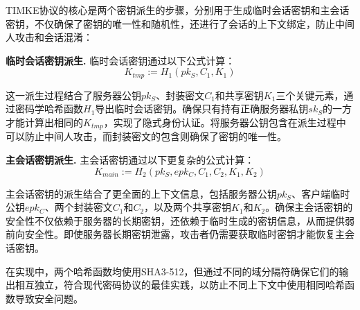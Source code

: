TIMKE协议的核心是两个密钥派生的步骤，分别用于生成临时会话密钥和主会话密钥，不仅确保了密钥的唯一性和随机性，还进行了会话的上下文绑定，防止中间人攻击和会话混淆：

\textbf{临时会话密钥派生.} 临时会话密钥通过以下公式计算：
\begin{equation}
K_{tmp} := H_1(pk_S, C_1, K_1)
\end{equation}

这一派生过程结合了服务器公钥$pk_S$、封装密文$C_1$和共享密钥$K_1$三个关键元素，通过密码学哈希函数$H_1$导出临时会话密钥。确保只有持有正确服务器私钥$sk_S$的一方才能计算出相同的$K_{tmp}$，实现了隐式身份认证。将服务器公钥包含在派生过程中可以防止中间人攻击，而封装密文的包含则确保了密钥的唯一性。

\textbf{主会话密钥派生.} 主会话密钥通过以下更复杂的公式计算：
\begin{equation}
K_{main} := H_2(pk_S, epk_C, C_1, C_2, K_1, K_2)
\end{equation}

主会话密钥的派生结合了更全面的上下文信息，包括服务器公钥$pk_S$、客户端临时公钥$epk_C$、两个封装密文$C_1$和$C_2$，以及两个共享密钥$K_1$和$K_2$。确保主会话密钥的安全性不仅依赖于服务器的长期密钥，还依赖于临时生成的密钥信息，从而提供弱前向安全性。即使服务器长期密钥泄露，攻击者仍需要获取临时密钥才能恢复主会话密钥。

在实现中，两个哈希函数均使用SHA3-512，但通过不同的域分隔符确保它们的输出相互独立，符合现代密码协议的最佳实践，以防止不同上下文中使用相同哈希函数导致安全问题。